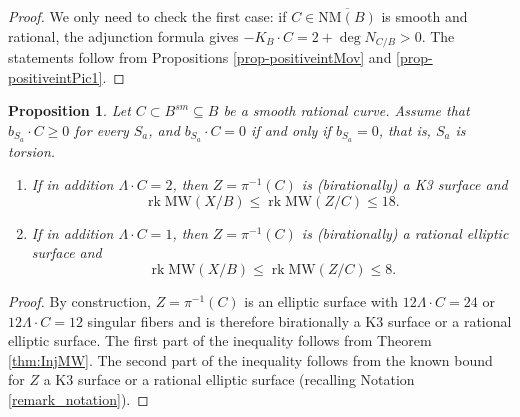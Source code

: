 \documentclass[11pt]{amsart}
\newtheorem{proposition}[theorem]{Proposition}
\theoremstyle{definition}
\theoremstyle{definition}
\theoremstyle{remark}
\theoremstyle{remark}
\theoremstyle{definition}
\theoremstyle{conjecture}
\newcommand{\MW}{\mathrm{MW}}
\begin{document}
\begin{proof} We only need to check the first case: if $C \in \overline{\mathrm{NM}(B)}$ is smooth and rational, the adjunction formula  gives $-K_B \cdot C = 2+ \deg N_{C/B} > 0$.  The statements follow from Propositions \ref{prop-positiveintMov} and \ref{prop-positiveintPic1}.
 \end{proof}

\begin{proposition} \label{prop:K3appearance1}Let $C \subset B^{sm} \subseteq B $ be a smooth rational curve. Assume that
$b_{S_a} \cdot C \geq 0$ for every $S_a$, and
$b_{S_a} \cdot C = 0$ if and only if $b_{S_a}=0$, that is, $S_a$ is torsion. 
\begin{enumerate}
    \item  If in addition $\Lambda \cdot C=2$, then $Z=\pi^{-1}(C)$ is  (birationally) a K3 surface and
\begin{equation*} \label{eq:rank18bound}
    \operatorname{rk} \MW(X/B) \leq \operatorname{rk} \MW(Z/C)   \leq 18.
    \end{equation*}
    \item  If in addition $\Lambda \cdot C=1$, then $Z=\pi^{-1}(C)$ is  (birationally) a rational elliptic surface and
\begin{equation*} \label{eq:rank18bound}
    \operatorname{rk} \MW(X/B) \leq \operatorname{rk} \MW(Z/C)   \leq 8.
    \end{equation*}
\color{black}
\end{enumerate}

    \end{proposition}
\begin{proof} 
By construction, $Z=\pi^{-1}(C)$ is an elliptic surface with  $ 12 \Lambda \cdot C =24$  or $ 12 \Lambda \cdot C =12 $ singular fibers and  is therefore birationally a K3 surface or a rational elliptic surface. 
 The first part of the inequality 
 follows from Theorem \ref{thm:InjMW}.
   The second part of the inequality  follows from the known bound
for $Z$ a K3 surface or a rational elliptic surface (recalling Notation \ref{remark_notation}).
\end{proof}
\end{document}
